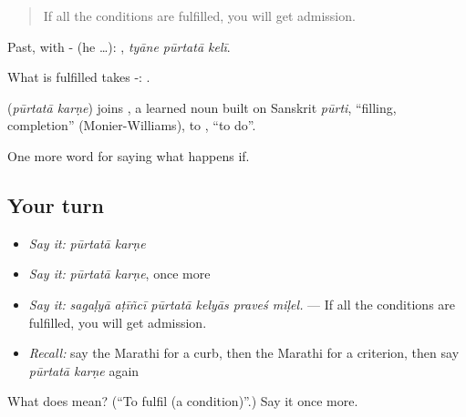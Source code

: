 \begin{quote}
If all the conditions are fulfilled, you will get admission.
\end{quote}

Past, with - (he …):   , \emph{tyāne pūrtatā kelī}.

What is fulfilled takes -:  .

\begin{cousinweb}
\textbf{ } (\emph{pūrtatā karṇe}) joins , a learned noun built on Sanskrit \emph{pūrti}, \textquotedblleft{}filling, completion\textquotedblright{} (Monier-Williams), to , \textquotedblleft{}to do\textquotedblright{}.
\end{cousinweb}

\begin{grammarlens}[title={What you've built}]
One more word for saying what happens if.
\end{grammarlens}

\subsection*{Your turn}
\begin{itemize}
\raggedright
  \item \emph{Say it:} \emph{pūrtatā karṇe}
  \item \emph{Say it:} \emph{pūrtatā karṇe}, once more
  \item \emph{Say it:} \emph{sagaḷyā aṭīñcī pūrtatā kelyās praveś miḷel.} — If all the conditions are fulfilled, you will get admission.
  \item \emph{Recall:} say the Marathi for a curb, then the Marathi for a criterion, then say \emph{pūrtatā karṇe} again
\end{itemize}

\begin{tcolorbox}[breakable,colback=teal!4,colframe=teal!35!black,title={Before you move on}]
What does   mean? (\textquotedblleft{}To fulfil (a condition)\textquotedblright{}.) Say it once more.
\end{tcolorbox}

